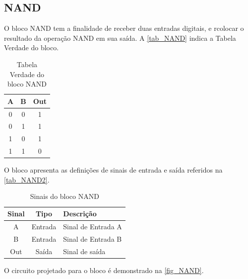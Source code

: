 \renewcommand{\NomeBloco}{NAND}
\renewcommand{\NomePTab}{tab_\NomeBloco}
\renewcommand{\NomeSTab}{tab_\NomeBloco2}
\renewcommand{\NomePFig}{fig_\NomeBloco}
\renewcommand{\NomeSFig}{fig_\NomeBloco2}
\renewcommand{\NomeTTab}{tab_\NomeBloco3}

\subsection{\NomeBloco}
\label{inversor1}

O bloco \NomeBloco{} tem a finalidade de receber duas entradas digitais, e rcolocar o resultado da opera{\c c}\~ao NAND em sua sa\'ida. A \autoref{\NomePTab} indica a Tabela Verdade do bloco.

\begin{table}[htbp]

\caption{Tabela Verdade do bloco \NomeBloco}%
\label{\NomePTab}
\centering
\begin{tabular}{ccc}
\toprule
    A & B & Out \\
    \midrule \midrule
    0 & 0 & 1 \\
    \midrule
    0 & 1 & 1\\
    \midrule
    1 & 0 & 1\\
    \midrule
    1 & 1 & 0\\
\bottomrule

\end{tabular}
\end{table}

O bloco apresenta as defini{\c c}\~oes de sinais de entrada e sa\'ida referidos na \autoref{\NomeSTab}.

\begin{table}[htbp]
\caption{Sinais do bloco \NomeBloco}
\label{\NomeSTab}
\centering
\begin{tabular}{ccl}

    \toprule
    Sinal & Tipo    & Descri{\c c}\~ao        \\
    \midrule \midrule
    A    & Entrada & Sinal de Entrada A \\
    \midrule
    B    & Entrada & Sinal de Entrada B \\
    \midrule
    Out    & Sa\'ida & Sinal de sa\'ida \\
    \bottomrule
\end{tabular}
\end{table}

O circuito projetado para o bloco \'e demonstrado na \autoref{\NomePFig}.

